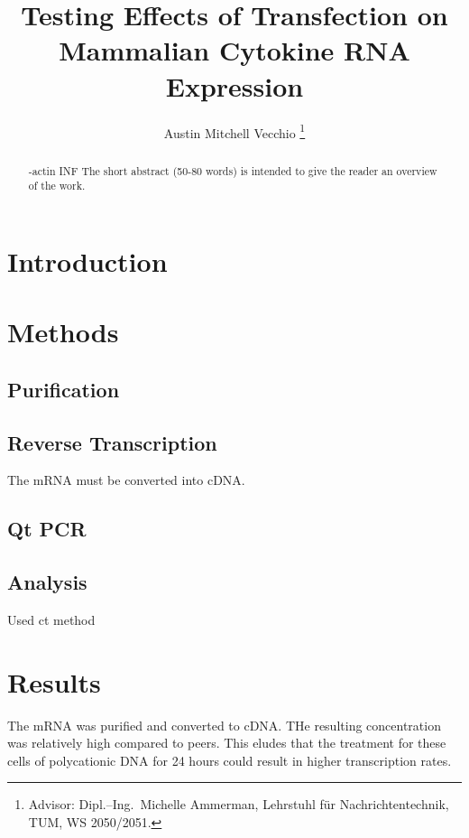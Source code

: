 \documentclass[journal, a4paper]{IEEEtran}
\begin{document}
    \title{Testing Effects of Transfection on Mammalian Cytokine RNA Expression}
    \author{Austin Mitchell Vecchio
    \thanks{Advisor: Dipl.--Ing.~Michelle Ammerman, Lehrstuhl f\"ur Nachrichtentechnik, TUM, WS 2050/2051.}}
    \maketitle

\begin{abstract}
    \beta -actin INF\alpha
    The short abstract (50-80 words) is intended to give the reader an overview of the work.
\end{abstract}

\section{Introduction}

\section{Methods}
    \subsection{Purification}
    \subsection{Reverse Transcription}
      The mRNA must be converted into cDNA.
    \subsection{Qt PCR}
    \subsection{Analysis}
        Used \Delta \Delta ct method

\section{Results}
  The mRNA was purified and converted to cDNA. THe resulting concentration was relatively high compared to peers. This eludes that the 
  treatment for these cells of polycationic DNA for 24 hours could result in higher transcription rates.
\end{document}
